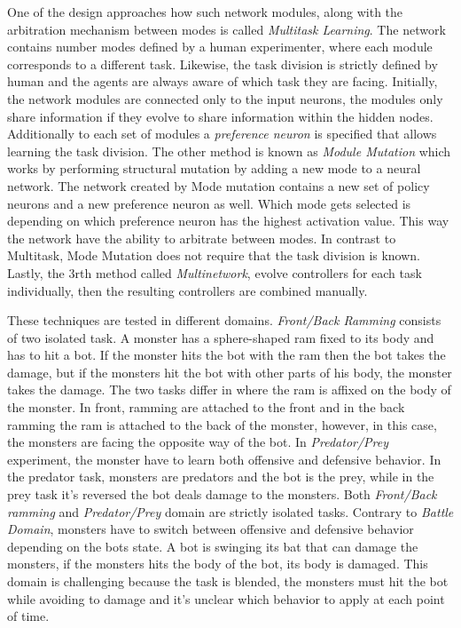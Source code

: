 \documentclass[format=acmsmall, review=false, screen=true]{acmart}
\begin{document}
One of the design approaches how such network modules, along with the arbitration mechanism between modes is called \emph{Multitask Learning}. The network contains number modes defined by a human experimenter, where each module corresponds to a different task. Likewise, the task division is strictly defined by human and the agents are always aware of which task they are facing. Initially, the network modules are connected only to the input neurons, the modules only share information if they evolve to share information within the hidden nodes. Additionally to each set of modules a \emph{preference neuron} is specified that allows learning the task division. The other method is known as \emph{Module Mutation} which works by performing structural mutation by adding a new mode to a neural network. The network created by Mode mutation contains a new set of policy neurons and a new preference neuron as well. Which mode gets selected is depending on which preference neuron has the highest activation value. This way the network have the ability to arbitrate between modes. In contrast to Multitask, Mode Mutation does not require that the task division is known. Lastly, the 3rth method called \emph{Multinetwork}, evolve controllers for each task individually, then the resulting controllers are combined manually.

These techniques are tested in different domains. \emph{Front/Back Ramming} \cite{schrum2012evolving} consists of two isolated task. A monster has a sphere-shaped ram fixed to its body and has to hit a bot. If the monster hits the bot with the ram then the bot takes the damage, but if the monsters hit the bot with other parts of his body, the monster takes the damage. The two tasks differ in where the ram is affixed on the body of the monster. In front, ramming are attached to the front and in the back ramming the ram is attached to the back of the monster, however, in this case, the monsters are facing the opposite way of the bot. In \emph{Predator/Prey} \cite{schrum2012evolving} experiment, the monster have to learn both offensive and defensive behavior. In the predator task, monsters are predators and the bot is the prey, while in the prey task it's reversed the bot deals damage to the monsters. Both \emph{Front/Back ramming} and \emph{Predator/Prey} domain are strictly isolated tasks. Contrary to \emph{Battle Domain}, monsters have to switch between offensive and defensive behavior depending on the bots state. A bot is swinging its bat that can damage the monsters, if the monsters hits the body of the bot, its body is damaged. This domain is challenging because the task is blended, the monsters must hit the bot while avoiding to damage and it's unclear which behavior to apply at each point of time.
\end{document}
